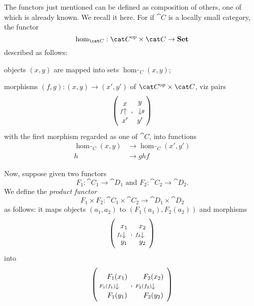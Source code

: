 \begin{exercise}
The functors just mentioned can be defined as composition of others, one of which is already known. We recall it here. For if \(\cat C\) is a locally small category, the functor
\[\hom_{\cat C} : \opcat C \times \cat C \to \Set\]
described as follows:
\begin{tcbitem}
\item objects \((x, y)\) are mapped into sets \(\hom_{\cat C}(x, y)\);
\item morphisms \((f, g) : (x, y) \to (x', y')\) of \(\opcat C \times \cat C\), viz pairs
\[\left(\begin{tikzcd}[row sep=small]x \\ x' \ar["f", u]\end{tikzcd}, \begin{tikzcd}[row sep=small]y \ar["g", d] \\ y'\end{tikzcd}\right)\]
with the first morphism regarded as one of \(\cat C\), into functions
\[\begin{aligned}
\hom_{\cat C}(x, y) &\to \hom_{\cat C}(x', y') \\
h &\to ghf
\end{aligned}\] 
\end{tcbitem}
Now, suppose given two functors
\[F_1 : \cat C_1 \to \cat D_1 \text{ and } F_2 : \cat C_2 \to \cat D_2.\]
We define the {\em product functor}
\[F_1 \times F_2 : \cat C_1 \times \cat C_2 \to \cat D_1 \times \cat D_2\]
as follows: it maps objects \((a_1, a_2)\) to \((F_1(a_1), F_2(a_2))\) and morphisms
\[\left(
\begin{tikzcd}[row sep=small]x_1 \ar["{f_1}", d, swap] \\ y_1\end{tikzcd},
\begin{tikzcd}[row sep=small]x_2 \ar["{f_2}", d, swap] \\ y_2\end{tikzcd}
\right)\]
into
\[\left(
\begin{tikzcd}[row sep=small]F_1(x_1) \ar["{F_1(f_1)}", d, swap] \\ F_1(y_1)\end{tikzcd},
\begin{tikzcd}[row sep=small]F_2(x_2) \ar["{F_2(f_2)}", d, swap] \\ F_2(y_2)\end{tikzcd}
\right)\]
\end{exercise}

